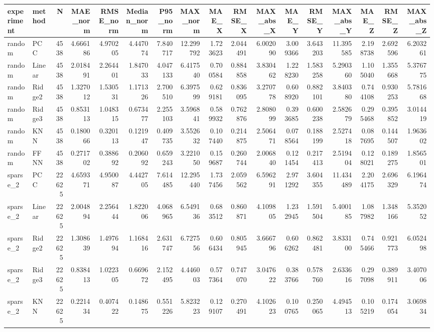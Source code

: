\begin{tabular}{llrrrrrrrrrrrrrrr}
\toprule
experiment & method & N & MAE_norm & RMSE_norm & Median_norm & P95_norm & MAX_norm & MAE_X & RMSE_X & MAX_abs_X & MAE_Y & RMSE_Y & MAX_abs_Y & MAE_Z & RMSE_Z & MAX_abs_Z \\
\midrule
random & PCC & 4538 & 4.666186 & 4.970205 & 4.447074 & 7.840717 & 12.299792 & 1.723623 & 2.044491 & 6.002090 & 3.009366 & 3.643203 & 11.395585 & 2.198738 & 2.692596 & 6.203261 \\
random & Linear & 4538 & 2.018491 & 2.264401 & 1.847033 & 4.047133 & 6.417540 & 0.700584 & 0.884858 & 3.830462 & 1.228230 & 1.583258 & 5.290360 & 1.105040 & 1.355668 & 5.376775 \\
random & Ridge2 & 4538 & 1.327012 & 1.530531 & 1.171326 & 2.700510 & 6.397599 & 0.629181 & 0.836095 & 3.270778 & 0.608920 & 0.882101 & 3.840380 & 0.744108 & 0.930253 & 5.781668 \\
random & Ridge3 & 4538 & 0.853113 & 1.048315 & 0.673477 & 2.255103 & 3.596841 & 0.589932 & 0.762876 & 2.808099 & 0.393685 & 0.600238 & 2.582679 & 0.295468 & 0.395852 & 3.014419 \\
random & KNN & 4538 & 0.180066 & 0.320113 & 0.121947 & 0.409735 & 3.552632 & 0.107440 & 0.214875 & 2.506471 & 0.078564 & 0.188199 & 2.527418 & 0.087695 & 0.144507 & 1.963602 \\
random & FFNN & 4538 & 0.271702 & 0.388692 & 0.206092 & 0.659243 & 3.221050 & 0.159687 & 0.260744 & 2.006840 & 0.121454 & 0.217413 & 2.519404 & 0.128021 & 0.189275 & 1.856501 \\
sparse_2 & PCC & 22625 & 4.659371 & 4.950087 & 4.442705 & 7.614485 & 12.295440 & 1.737456 & 2.059562 & 6.596291 & 2.971292 & 3.604355 & 11.434489 & 2.204175 & 2.696329 & 6.196474 \\
sparse_2 & Linear & 22625 & 2.004894 & 2.256444 & 1.822006 & 4.068965 & 6.549136 & 0.683512 & 0.860871 & 4.109805 & 1.232945 & 1.591504 & 5.400185 & 1.087982 & 1.348166 & 5.352052 \\
sparse_2 & Ridge2 & 22625 & 1.308639 & 1.497694 & 1.168416 & 2.631747 & 6.727556 & 0.606434 & 0.805945 & 3.666796 & 0.606262 & 0.862481 & 3.833100 & 0.745466 & 0.921773 & 6.052498 \\
sparse_2 & Ridge3 & 22625 & 0.838413 & 1.022305 & 0.669672 & 2.152495 & 4.446003 & 0.577364 & 0.747070 & 3.047622 & 0.383766 & 0.578760 & 2.633616 & 0.297098 & 0.389911 & 3.407006 \\
sparse_2 & KNN & 22625 & 0.221434 & 0.407422 & 0.148675 & 0.551226 & 5.823223 & 0.129107 & 0.270491 & 4.102623 & 0.100765 & 0.250065 & 4.494513 & 0.105219 & 0.174054 & 3.069834 \\

\end{tabular}
